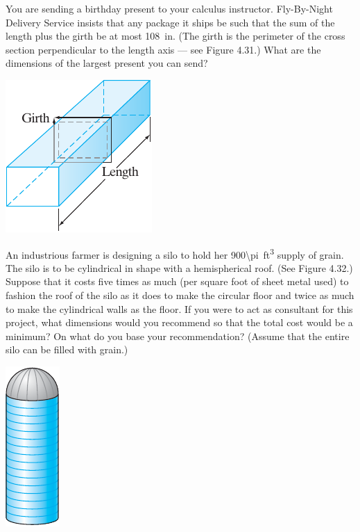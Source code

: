 \documentclass[boxes]{gsypset}
\begin{document}
	\begin{problem}[4.3.24]
		You are sending a birthday present to your calculus instructor. 
		Fly-By-Night Delivery Service insists that any package it ships be such that 
		the sum of the length plus the girth be at most \SI{108}{in}. 
		(The girth is the perimeter of the cross section perpendicular to the length axis
		--- see Figure 4.31.) 
		What are the dimensions of the largest present you can send?
		\begin{center}
			\includegraphics{img/4_3_24}
			\renewcommand{\thefigure}{4.31}
		\end{center}
	\end{problem}
	\begin{solution}
		
	\end{solution}
	
	\begin{problem}[4.3.26]
		An industrious farmer is designing a silo to hold her 
		\SI[parse-numbers=false]{900\pi}{ft^3} supply of grain. 
		The silo is to be cylindrical in shape with a hemispherical roof. 
		(See Figure 4.32.) 
		Suppose that it costs five times as much (per square foot of sheet metal used) 
		to fashion the roof of the silo as it does to make the circular floor and 
		twice as much to make the cylindrical walls as the floor. 
		If you were to act as consultant for this project, 
		what dimensions would you recommend so that the total cost would be a minimum? 
		On what do you base your recommendation? 
		(Assume that the entire silo can be filled with grain.)
		\begin{center}
			\includegraphics{img/4_3_26}
			\renewcommand{\thefigure}{4.32}
		\end{center}
	\end{problem}
	\begin{solution}
		
	\end{solution}
\end{document}
